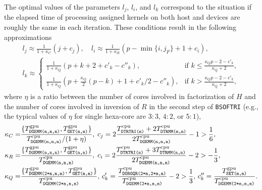 \documentclass{llncs}
\newcommand{\Bsoftri}{\texttt{BSOFTRI}\xspace}
\begin{document}
The optimal values of the parameters $l_j$, $l_i$, and $l_k$ 
correspond to the situation 
if the elapsed time of processing assigned kernels
on both host and devices are roughly the same in each iteration. 
These conditions result in the following approximations 
\begin{align}
  \label{eq:l_j}
  l_j \approx \frac{1}{1 + \kappa_C} \left(j + c_j \right)
  , \quad %
  l_i \approx \frac{1}{1 + \kappa_R} \left( p-\min\{i,j_F\}+1 + c_i \right), 
  \\
  \label{eq:l_k}
    l_k \approx 
    \begin{cases}
        \displaystyle \frac{1}{1 + \kappa_Q} \left( p+k + 2 +c'_k - c''_k\right),
      & \mbox{if } k \leq \displaystyle \frac{ \kappa_{Q} p -2 - c'_{k}}{\kappa_{Q} + 2},\\ %
        \displaystyle \frac{1}{1 + \kappa_Q} \left(p  + \frac{\kappa_Q}{2}(p-k) + 1 + c'_k/2 - c''_k\right),
      & \mbox{if } k > \displaystyle \frac{ \kappa_{Q} p -2 - c'_{k}}{\kappa_{Q} + 2}, %
    \end{cases}
\end{align}
where $\eta$ is a ratio between the number of cores involved in factorization of $H$
and the number of cores involved in inversion of $R$ in the second step of \Bsoftri 
(e.g., the typical values of $\eta$ for single hexa-core are $3:3$, $4:2$, or $5:1$),
\begin{align*}
  \kappa_C =& \frac{\{T_{\texttt{DGEMM(n,n,n)}}^{\rm gpu},T^{\rm gpu}_{\texttt{GET(n,n)}}\}}{T^{\rm cpu}_{\texttt{DGEMM(n,n,n)}} / (1 + \eta)} 
  , \;
  c_j = 2 \frac{T^{\rm cpu}_{\texttt{DTRTRI(n)}} + 2 T^{\rm cpu}_{\texttt{DTRMM(n,n)}}}{2 T^{\rm cpu}_{\texttt{DGEMM(n,n,n)}}} - 1 > \frac{1}{6}
  ,\;
  \\
  \kappa_R =& \frac{\{T_{\texttt{DGEMM(n,n,n)}}^{\rm gpu},T^{\rm gpu}_{\texttt{GET(n,n)}}\}}{T^{\rm cpu}_{\texttt{DGEMM(n,n,n)}}} 
  , \;
  c_i = 
  2 \frac{T^{\rm cpu}_{\texttt{DTRTRI(n)}} + 3T^{\rm cpu}_{\texttt{DTRMM(n,n)}}}{2 T^{\rm cpu}_{\texttt{DGEMM(n,n,n)}}} - 2 > -\frac{1}{3},
  \\
  \kappa_Q  =& \frac{\{T_{\texttt{DGEMM(2*n,n,n)}}^{\rm gpu},T^{\rm gpu}_{\texttt{GET(n,n)}}\}}{T^{\rm cpu}_{\texttt{DGEMM(2*n,n,n)}}} 
  , \,
  c'_k  = \frac{T^{\rm cpu}_\texttt{DORGQR(2*n,2*n,n)}}{T^{\rm cpu}_\texttt{DGEMM(2*n,n,n)}} - 2 > \frac{1}{3}
  , \,
  c''_k = {%
    \frac{T^{\rm gpu}_{\texttt{SET(n,n)}}}{%
    T_{\texttt{DGEMM(2*n,n,n)}}^{\rm cpu}}}
  .
\end{align*}
\end{document}
